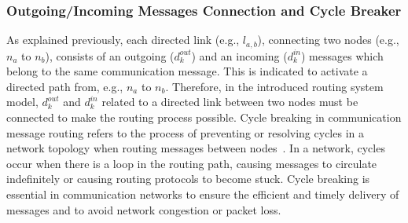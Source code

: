      
  
     
    
    
    
    \subsubsection{Outgoing/Incoming Messages Connection and Cycle Breaker}
    
     
       As explained previously, each directed link (e.g., $l_{a,b}$), connecting two nodes (e.g., $n_a$ to $n_b$), consists of an outgoing ($d_k^{out}$) and an incoming ($d_k^{in}$) messages which belong to the same communication message. This is indicated to activate a directed path from, e.g., $n_a$ to $n_b$. Therefore, in the introduced routing system model, $d_k^{out}$ and $d_k^{in}$ related to a directed link between two nodes must be connected to make the routing process possible. Cycle breaking in communication message routing refers to the process of preventing or resolving cycles in a network topology when routing messages between nodes~\cite{9565115}. In a network, cycles occur when there is a loop in the routing path, causing messages to circulate indefinitely or causing routing protocols to become stuck. Cycle breaking is essential in communication networks to ensure the efficient and timely delivery of messages and to avoid network congestion or packet loss. 
      
